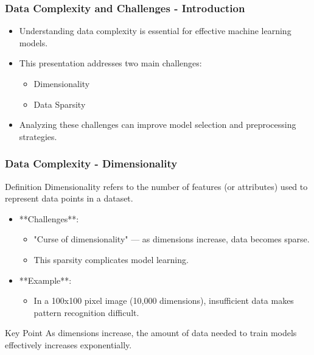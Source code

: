 \documentclass[aspectratio=169]{beamer}
\begin{document}
\begin{frame}[fragile]
    \frametitle{Data Complexity and Challenges - Introduction}
    \begin{itemize}
        \item Understanding data complexity is essential for effective machine learning models.
        \item This presentation addresses two main challenges:
        \begin{itemize}
            \item Dimensionality
            \item Data Sparsity
        \end{itemize}
        \item Analyzing these challenges can improve model selection and preprocessing strategies.
    \end{itemize}
\end{frame}

\begin{frame}[fragile]
    \frametitle{Data Complexity - Dimensionality}
    \begin{block}{Definition}
        Dimensionality refers to the number of features (or attributes) used to represent data points in a dataset.
    \end{block}
    \begin{itemize}
        \item **Challenges**: 
        \begin{itemize}
            \item "Curse of dimensionality" — as dimensions increase, data becomes sparse.
            \item This sparsity complicates model learning.
        \end{itemize}
        \item **Example**: 
        \begin{itemize}
            \item In a 100x100 pixel image (10,000 dimensions), insufficient data makes pattern recognition difficult.
        \end{itemize}
    \end{itemize}
    \begin{alertblock}{Key Point}
        As dimensions increase, the amount of data needed to train models effectively increases exponentially.
    \end{alertblock}
\end{frame}
\end{document}
